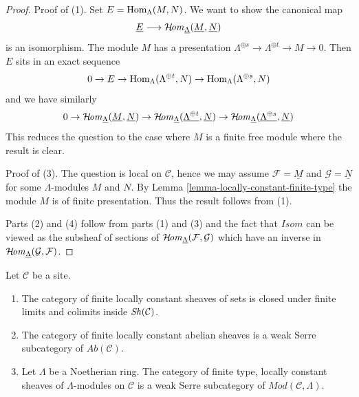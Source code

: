 \begin{proof}
Proof of (1). Set $E = \mathop{\mathrm{Hom}}\nolimits_\Lambda(M, N)$. We want to show the canonical map
$$
\underline{E}
\longrightarrow
\mathop{\mathcal{H}\!\mathit{om}}\nolimits_{\underline{\Lambda}}(\underline{M}, \underline{N})
$$
is an isomorphism. The module $M$ has a presentation
$\Lambda^{\oplus s} \to \Lambda^{\oplus t} \to M \to 0$.
Then $E$ sits in an exact sequence
$$
0 \to E \to \mathop{\mathrm{Hom}}\nolimits_\Lambda(\Lambda^{\oplus t}, N) \to
\mathop{\mathrm{Hom}}\nolimits_\Lambda(\Lambda^{\oplus s}, N)
$$
and we have similarly
$$
0 \to
\mathop{\mathcal{H}\!\mathit{om}}\nolimits_{\underline{\Lambda}}(\underline{M}, \underline{N}) \to
\mathop{\mathcal{H}\!\mathit{om}}\nolimits_{\underline{\Lambda}}(\underline{\Lambda^{\oplus t}}, \underline{N})
\to
\mathop{\mathcal{H}\!\mathit{om}}\nolimits_{\underline{\Lambda}}(\underline{\Lambda^{\oplus s}}, \underline{N})
$$
This reduces the question to the case where $M$ is a finite free module
where the result is clear.

\medskip\noindent
Proof of (3). The question is local on $\mathcal{C}$, hence we may assume
$\mathcal{F} = \underline{M}$ and $\mathcal{G} = \underline{N}$
for some $\Lambda$-modules $M$ and $N$.
By Lemma \ref{lemma-locally-constant-finite-type}
the module $M$ is of finite presentation. Thus the result follows from (1).

\medskip\noindent
Parts (2) and (4) follow from parts (1) and (3) and the
fact that $\mathit{Isom}$ can be viewed as the subsheaf of sections of
$\mathop{\mathcal{H}\!\mathit{om}}\nolimits_{\underline{\Lambda}}(\mathcal{F}, \mathcal{G})$
which have an inverse in
$\mathop{\mathcal{H}\!\mathit{om}}\nolimits_{\underline{\Lambda}}(\mathcal{G}, \mathcal{F})$.
\end{proof}

\begin{lemma}
\label{lemma-kernel-finite-locally-constant}
Let $\mathcal{C}$ be a site.
\begin{enumerate}
\item The category of finite locally constant sheaves of sets
is closed under finite limits and colimits inside $\mathop{\mathit{Sh}}\nolimits(\mathcal{C})$.
\item The category of finite locally constant abelian sheaves is a
weak Serre subcategory of $\textit{Ab}(\mathcal{C})$.
\item Let $\Lambda$ be a Noetherian ring. The category of
finite type, locally constant sheaves of $\Lambda$-modules on
$\mathcal{C}$ is a weak Serre subcategory of
$\textit{Mod}(\mathcal{C}, \Lambda)$.
\end{enumerate}
\end{lemma}

